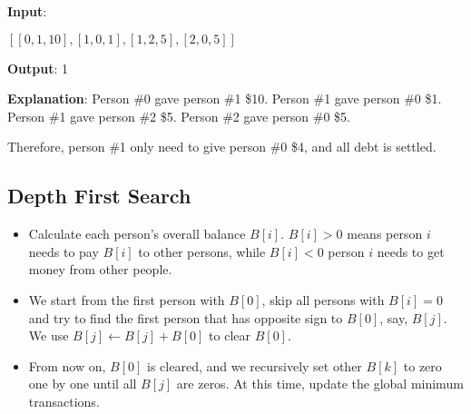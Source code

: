 \begin{flushleft}
\textbf{Input}:

$ [[0,1,10], [1,0,1], [1,2,5], [2,0,5]] $

\textbf{Output}: 1

\textbf{Explanation}:
Person \#0 gave person \#1 \$10.
Person \#1 gave person \#0 \$1.
Person \#1 gave person \#2 \$5.
Person \#2 gave person \#0 \$5.

Therefore, person \#1 only need to give person \#0 \$4, and all debt is settled.
\end{flushleft}

\subsection{Depth First Search}
\begin{itemize}
\item Calculate each person's overall balance $B[i]$. $B[i]>0$ means person $i$ needs to pay $B[i]$ to other persons, while $B[i]<0$ person $i$ needs to get money from other people. 
\item We start from the first person with $B[0]$, skip all persons with $B[i]=0$ and try to find the first person that has opposite sign to $B[0]$, say, $B[j]$. We use $B[j]\gets B[j]+B[0]$ to clear $B[0]$.
\item From now on, $B[0]$ is cleared, and we recursively set other $B[k]$ to zero one by one until all $B[j]$ are zeros. At this time, update the global minimum transactions.
\end{itemize}

